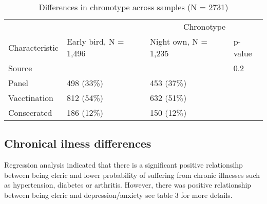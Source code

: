 \documentclass[ijerph,article,accept,moreauthors,pdftex]{mdpi}
\begin{document}
\begin{table}[!h]

\caption{\label{tab:contingenty tables}Differences in chronotype across samples (N = 2731)}
\centering
\begin{tabular}[t]{llll}
\toprule
\multicolumn{2}{c}{ } & \multicolumn{2}{c}{Chronotype} \\
\cmidrule(l{3pt}r{3pt}){3-4}
Characteristic & Early bird, N = 1,496 & Night own, N = 1,235 & p-value\\
\midrule
Source &  &  & 0.2\\
\hspace{1em}Panel & 498 (33\%) & 453 (37\%) & \\
\hspace{1em}Vacctination & 812 (54\%) & 632 (51\%) & \\
\hspace{1em}Consecrated & 186 (12\%) & 150 (12\%) & \\
\bottomrule
\end{tabular}
\end{table}

\hypertarget{chronical-ilness-differences}{%
\subsection{Chronical ilness
differences}\label{chronical-ilness-differences}}

Regression analysis indicated that there is a significant positive
relationsihp between being cleric and lower probability of suffering
from chronic illnesses such as hypertension, diabetes or arthritis.
However, there was positive relationship between being cleric and
depression/anxiety see table 3 for more details.
\end{document}
